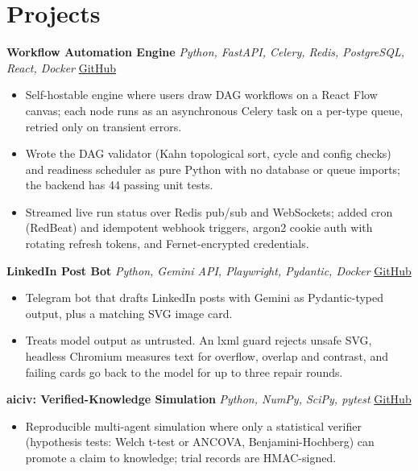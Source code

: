 \documentclass[10pt,a4paper]{article}
\newcommand{\project}[4]{%
  \textbf{#1} \textbar{} \textit{#2} \hfill \href{#4}{#3}\par}
\begin{document}
\section{Projects}
\project{Workflow Automation Engine}{Python, FastAPI, Celery, Redis, PostgreSQL, React, Docker}{GitHub}{https://github.com/shivam-srivastava-031/Workflow-Automation-System}
\begin{itemize}
  \item Self-hostable engine where users draw DAG workflows on a React Flow canvas; each node runs as an asynchronous Celery task on a per-type queue, retried only on transient errors.
  \item Wrote the DAG validator (Kahn topological sort, cycle and config checks) and readiness scheduler as pure Python with no database or queue imports; the backend has 44 passing unit tests.
  \item Streamed live run status over Redis pub/sub and WebSockets; added cron (RedBeat) and idempotent webhook triggers, argon2 cookie auth with rotating refresh tokens, and Fernet-encrypted credentials.
\end{itemize}
\vspace{2pt}

\project{LinkedIn Post Bot}{Python, Gemini API, Playwright, Pydantic, Docker}{GitHub}{https://github.com/shivam-srivastava-031/Telegram_linkedin_post}
\begin{itemize}
  \item Telegram bot that drafts LinkedIn posts with Gemini as Pydantic-typed output, plus a matching SVG image card.
  \item Treats model output as untrusted. An lxml guard rejects unsafe SVG, headless Chromium measures text for overflow, overlap and contrast, and failing cards go back to the model for up to three repair rounds.
\end{itemize}
\vspace{2pt}

\project{aiciv: Verified-Knowledge Simulation}{Python, NumPy, SciPy, pytest}{GitHub}{https://github.com/shivam-srivastava-031/Dev-AI_world}
\begin{itemize}
  \item Reproducible multi-agent simulation where only a statistical verifier (hypothesis tests: Welch t-test or ANCOVA, Benjamini-Hochberg) can promote a claim to knowledge; trial records are HMAC-signed.
\end{itemize}

\end{document}
